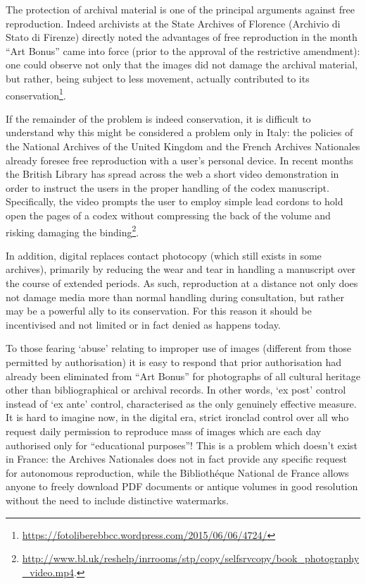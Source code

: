 \documentclass[amsthm,ebook]{saparticle}
\begin{document}
The protection of archival material is one of the principal arguments against free reproduction. Indeed archivists at
the State Archives of Florence (Archivio di Stato di Firenze) directly noted the advantages of free reproduction in the
month ``Art Bonus'' came into force (prior to the approval of the restrictive amendment): one could observe not only that
the images did not damage the archival material, but rather, being subject to less movement, actually contributed to
its conservation\footnote{\url{https://fotoliberebbcc.wordpress.com/2015/06/06/4724/}}.

If the remainder of the problem is indeed conservation, it is difficult to understand why this might be considered a
problem only in Italy: the policies of the National Archives of the United Kingdom and the French Archives Nationales
already foresee free reproduction with a user’s personal device. In recent months the British Library has spread across
the web a short video demonstration in order to instruct the users in the proper handling of the codex manuscript.
Specifically, the video prompts the user to employ simple lead cordons to hold open the pages of a codex without
compressing the back of the volume and risking damaging the
binding\footnote{\url{http://www.bl.uk/reshelp/inrrooms/stp/copy/selfsrvcopy/book\_photography\_video.mp4}.}. 

In addition, digital replaces contact photocopy (which still exists in some archives), primarily by reducing the wear
and tear in handling a manuscript over the course of extended periods. As such, reproduction at a distance not only
does not damage media more than normal handling during consultation, but rather may be a powerful ally to its
conservation. For this reason it should be incentivised and not limited or in fact denied as happens today. 

To those fearing `abuse' relating to improper use of images (different from those permitted by authorisation) it is easy
to respond that prior authorisation had already been eliminated from ``Art Bonus'' for photographs of all cultural
heritage other than bibliographical or archival records. In other words, `ex post' control instead of `ex ante'
control, characterised as the only genuinely effective measure. It is hard to imagine now, in the digital era, strict
ironclad control over all who request daily permission to reproduce mass of images which are each day authorised only
for ``educational purposes''! This is a problem which doesn’t exist in France: the Archives Nationales does not in fact
provide any specific request for autonomous reproduction, while the Bibliothéque National de France allows anyone to
freely download PDF documents or antique volumes in good resolution without the need to include distinctive watermarks.
\end{document}

